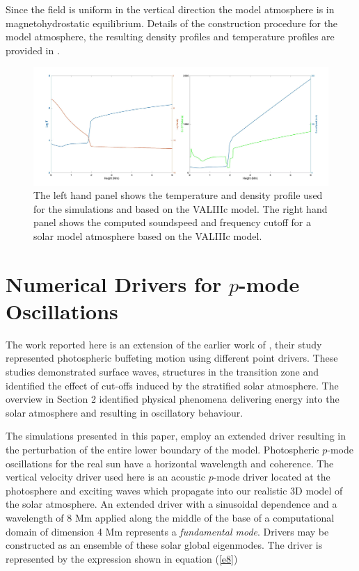 \documentclass[linenumbers]{aastex63}
\begin{document}
Since the field is uniform in the vertical direction the model atmosphere is in magnetohydrostatic equilibrium. Details of the construction procedure for the model atmosphere, the resulting density profiles and temperature profiles are provided in \citet{Griffiths2018b}. 
 
\begin{figure}[h]\label{soundspeedVAL3C_profile_fig1R}
\includegraphics[scale=0.055]{solatmosprofiles.jpg}
\caption{The left hand panel shows the temperature and density profile used for the simulations and based on the VALIIIc model. The right hand panel shows the computed soundspeed and frequency cutoff for a solar model atmosphere based on the VALIIIc model.}
\end{figure}

\section{Numerical Drivers for $p$-mode Oscillations}

The work reported here is an extension of the earlier work of \citet{Malins2007}, their study represented photospheric buffeting motion using different point drivers. These studies demonstrated surface waves, structures in the transition zone and identified the effect of cut-offs induced by the stratified  solar atmosphere. The overview in Section 2 identified physical phenomena delivering energy into the solar atmosphere and resulting in oscillatory behaviour. 

The simulations presented in this paper, employ an extended driver resulting in the perturbation of the entire lower boundary of the model.  Photospheric $p$-mode oscillations for the real sun have a horizontal wavelength and coherence. The vertical velocity driver used here is an acoustic $p$-mode driver located at the photosphere and exciting waves which propagate 
into our realistic 3D model of the solar atmosphere. An extended driver with a sinusoidal dependence and a wavelength of 8 Mm applied along the middle of the base of a computational domain of dimension 4 Mm represents  a {\it fundamental mode}. Drivers may be constructed as an ensemble of these solar global eigenmodes. The driver is represented by the expression shown in equation (\ref{e8}) 
\end{document}
